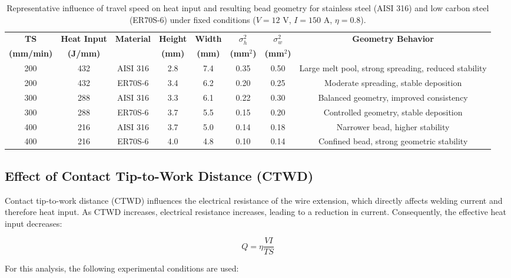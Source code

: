\documentclass[conference]{IEEEtran}
\begin{document}
\begin{table}[H]
\centering
\caption{Representative influence of travel speed on heat input and resulting bead geometry for stainless steel (AISI 316) and low carbon steel (ER70S-6) under fixed conditions ($V=12$ V, $I=150$ A, $\eta=0.8$).}
\label{tab:ts_geometry_comparison}
\begin{tabular}{c c c c c c c c}
\toprule
\textbf{TS} & \textbf{Heat Input} & \textbf{Material} & \textbf{Height} & \textbf{Width} & \textbf{$\sigma_h^2$} & \textbf{$\sigma_w^2$} & \textbf{Geometry Behavior} \\
\textbf{(mm/min)} & \textbf{(J/mm)} &  & \textbf{(mm)} & \textbf{(mm)} & \textbf{(mm$^2$)} & \textbf{(mm$^2$)} &  \\
\midrule
200 & 432 & AISI 316 & 2.8 & 7.4 & 0.35 & 0.50 & Large melt pool, strong spreading, reduced stability \\
200 & 432 & ER70S-6  & 3.4 & 6.2 & 0.20 & 0.25 & Moderate spreading, stable deposition \\
\midrule
300 & 288 & AISI 316 & 3.3 & 6.1 & 0.22 & 0.30 & Balanced geometry, improved consistency \\
300 & 288 & ER70S-6  & 3.7 & 5.5 & 0.15 & 0.20 & Controlled geometry, stable deposition \\
\midrule
400 & 216 & AISI 316 & 3.7 & 5.0 & 0.14 & 0.18 & Narrower bead, higher stability \\
400 & 216 & ER70S-6  & 4.0 & 4.8 & 0.10 & 0.14 & Confined bead, strong geometric stability \\
\bottomrule
\end{tabular}
\end{table}



\subsection{Effect of Contact Tip-to-Work Distance (CTWD)}

Contact tip-to-work distance (CTWD) influences the electrical resistance of the wire extension, which directly affects welding current and therefore heat input. As CTWD increases, electrical resistance increases, leading to a reduction in current. Consequently, the effective heat input decreases:

\begin{equation}
Q = \eta \frac{V I}{TS}
\end{equation}

For this analysis, the following experimental conditions are used:
\end{document}
